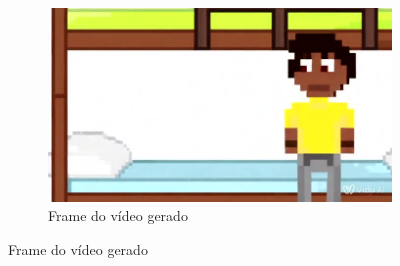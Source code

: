 \begin{figure}[htbp]
\begin{subfigure}{0.55\linewidth}
        \includegraphics[width=1\linewidth]{figs/vidu/frame6_real.jpg}
        \caption{\small Frame do vídeo gerado}
        \label{fig:vidu6b}
    \end{subfigure}
\end{figure}

